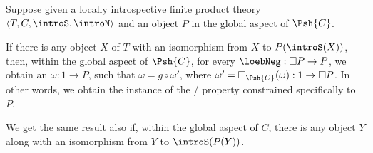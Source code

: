 \begin{theorem}\label{PreIntrospDiagFromIso}
Suppose given a locally introspective finite product theory $\langle T, C, \introS, \introN \rangle$ and an object $P$ in the global aspect of $\Psh{C}$.

If there is any object $X$ of $T$ with an isomorphism from $X$ to $P(\introS(X))$, then, within the global aspect of $\Psh{C}$, for every $\loebNeg : \Box P \to P$, we obtain an $\omega : 1 \to P$, such that $\omega = g \circ \omega'$, where $\omega' = \Box_{\Psh{C}}(\omega) : 1 \to \Box P$. In other words, we obtain the instance of the \Loeb/ property constrained specifically to $P$.

We get the same result also if, within the global aspect of $C$, there is any object $Y$ along with an isomorphism from $Y$ to $\introS(P(Y))$.
\end{theorem}
